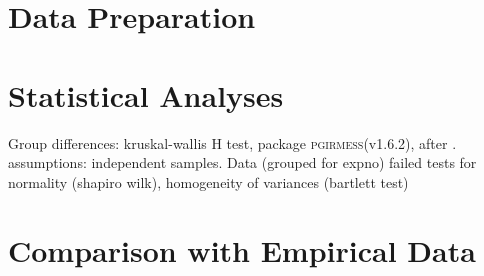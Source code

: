 \section{Data Preparation}
\label{chap:mat:data}

\section{Statistical Analyses}
\label{chap:mat:stats}

Group differences: kruskal-wallis H test, package \textsc{pgirmess}(v1.6.2), after \cite{Siegel1988}. assumptions: independent samples. Data (grouped for expno) failed tests for normality (shapiro wilk), homogeneity of variances (bartlett test)

\section{Comparison with Empirical Data}
\label{chap:mat:emp}

